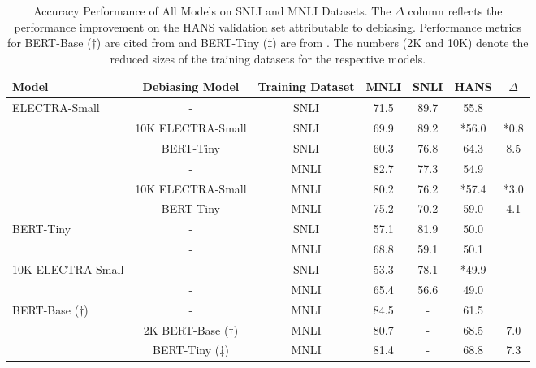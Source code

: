 \documentclass[11pt,a4paper]{article}
\begin{document}
\begin{table*}[th]
\begin{center}
\begin{tabular}{lcccccc}
\hline \textbf{Model} & \textbf{Debiasing Model} & \textbf{Training Dataset} & \textbf{MNLI} & \textbf{SNLI} & \textbf{HANS} & $\Delta$ \\ \hline
\multirow{6}{*}{ELECTRA-Small} & - & SNLI & 71.5 & 89.7 & 55.8 &  \\
& 10K ELECTRA-Small &SNLI & 69.9 & 89.2 & *56.0 & *0.8\\ 
& BERT-Tiny &SNLI & 60.3 & 76.8 & 64.3 & 8.5 \\ \cline{2-7}
& - &MNLI & 82.7 & 77.3 & 54.9 & \\ 
& 10K ELECTRA-Small &MNLI & 80.2 & 76.2 & *57.4 & *3.0 \\  
& BERT-Tiny &MNLI & 75.2 & 70.2 & 59.0 & 4.1\\ 
\hline 
\multirow{2}{*}{BERT-Tiny} &-& SNLI & 57.1 & 81.9 & 50.0 \\ \cline{2-7}
&-&MNLI & 68.8 & 59.1 & 50.1 \\ \hline 
\multirow{2}{*}{10K ELECTRA-Small} &-& SNLI & 53.3 & 78.1 & *49.9 \\ \cline{2-7}
&-&MNLI & 65.4 & 56.6 & 49.0 \\ 
\hline 
\multirow{3}{*}{BERT-Base ($\dagger$)}&-&MNLI & 84.5 & - & 61.5 \\ 
& 2K BERT-Base ($\dagger$) &MNLI & 80.7 & - & 68.5 &7.0 \\
& BERT-Tiny ($\ddagger$) &MNLI & 81.4 & - & 68.8 & 7.3 \\
\hline
\end{tabular}
\end{center}
\caption{Accuracy Performance of All Models on SNLI and MNLI Datasets. The $\Delta$ column reflects the performance improvement on the HANS validation set attributable to debiasing. Performance metrics for BERT-Base ($\dagger$) are cited from \citet{utama2020debiasing} and BERT-Tiny ($\ddagger$) are from \citet{sanh2020learning}. The numbers (2K and 10K) denote the reduced sizes of the training datasets for the respective models.}
\label{table: main-results}
\end{table*}
\end{document}
